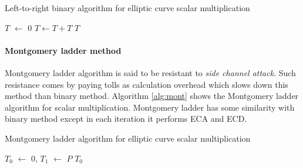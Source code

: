  \begin{algorithm}[H]
  \caption{Left-to-right binary algorithm for elliptic curve scalar multiplication}
  \label{alg:bin}
  \DontPrintSemicolon
  \hspace{-3ex}
  \;
  \hspace{-3ex}
   \;%
  \nl $T$ $ \leftarrow$ $0$ \;
  \nl {} {\;
  \nl		$T \leftarrow T  + T$\;
 \nl    {} }\;
  \nl {} $T$\;
  \end{algorithm}

\paragraph{Montgomery ladder method}
Montgomery ladder algorithm is said to be resistant to \textit{side channel attack}. Such resistance comes by paying tolls as calculation overhead which slows down this method than binary method. Algorithm \ref{alg:mont} shows the Montgomery ladder algorithm for scalar multiplication. Montgomery ladder has some similarity with binary method except in each iteration it performs ECA and ECD. 

 \begin{algorithm}[H]
  \caption{Montgomery ladder algorithm for elliptic curve scalar multiplication}
  \label{alg:mont}
  \DontPrintSemicolon
  \hspace{-3ex}
  \;
  \hspace{-3ex}
   \;%
  \nl $T_0$ $ \leftarrow$ $0$, $T_1$ $\leftarrow$ $P$ \;
  \nl {} {\;
   \nl  {}
  }\;
  \nl {} $T_0$\;
\end{algorithm}

